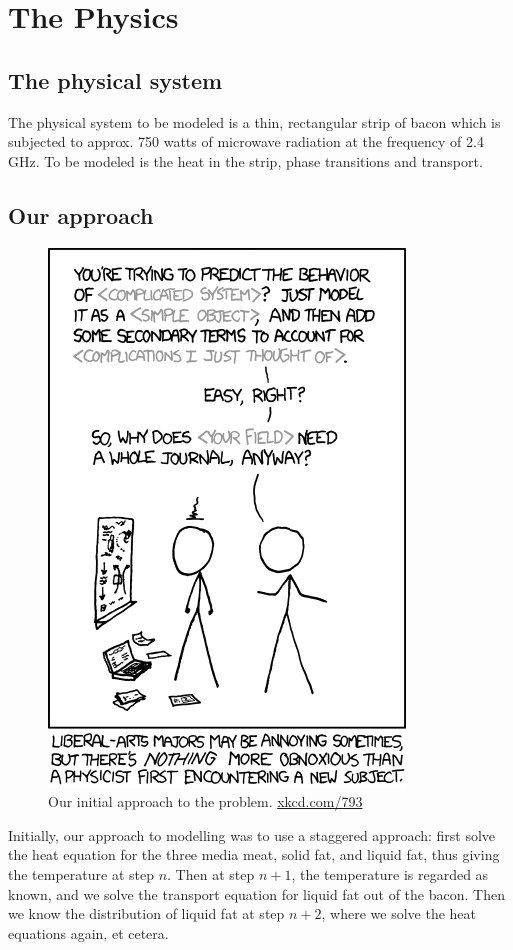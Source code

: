 \chapter{The Physics}
\section{The physical system}
The physical system to be modeled is a thin, rectangular strip of bacon which is
subjected to approx. 750 watts of microwave radiation at the frequency of 2.4
GHz. To be modeled is the heat in the strip, phase transitions and transport.

\section{Our approach}
\begin{figure}[!h]
  \begin{center}
    \includegraphics[width=0.35\linewidth]{physicists.png}
  \end{center}
  \caption{Our initial approach to the problem. \url{xkcd.com/793}}
  \label{fig:xkcd_physics}
\end{figure}

Initially, our approach to modelling was to use a staggered approach: first solve the
heat equation for the three media meat, solid fat, and liquid fat, thus giving
the temperature at step $n$. Then at step $n+1$, the temperature is regarded as
known, and we solve the transport equation for liquid fat out of the bacon. Then
we know the distribution of liquid fat at step $n+2$, where we solve the heat
equations again, et cetera.


